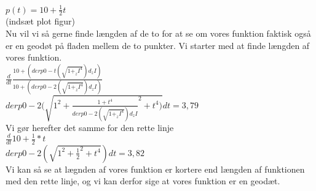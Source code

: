 \documentclass[12pt]{article}
\begin{document}
$p(t)=10+ \frac{1}{2}t $ \\
(indsæt plot figur) \\
Nu vil vi så gerne finde længden af de to for at se om vores funktion faktisk også er en geodøt på fladen mellem de to punkter. Vi starter med at finde længden af vores funktion. \\
$ \frac{d}{dt} \frac{10+(derp 0-t(\sqrt{1+_zI^4})d_zI)}{10+(derp 0-2(\sqrt{1+_zI^4})d_zI)}$ \\
$derp 0-2(\sqrt{1^2+ \frac{1+t^4}{derp 0-2(\sqrt{1+_zI^4})d_zI}^2+t^4)}dt=3,79  $\\
Vi gør herefter det samme for den rette linje \\
$ \frac{d}{dt}10+ \frac{1}{2}*t $\\
$derp 0-2(\sqrt{1^2+\frac{1}{2}^2+t^4})dt=3,82 $\\
Vi kan så se at lægnden af vores funktion er kortere end længden af funktionen med den rette linje, og vi kan derfor sige at vores funktion er en geodæt.
\end{document}
